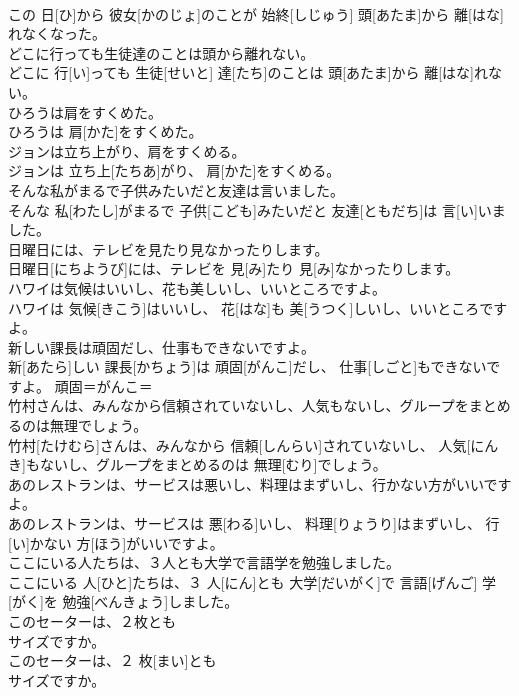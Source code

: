 \documentclass[8pt]{extreport}
\begin{document}
\begin{CJK}{UTF8}{min}
\\	この 日[ひ]から 彼女[かのじょ]のことが 始終[しじゅう] 頭[あたま]から 離[はな]れなくなった。	
\\	どこに行っても生徒達のことは頭から離れない。	
\\	どこに 行[い]っても 生徒[せいと] 達[たち]のことは 頭[あたま]から 離[はな]れない。	
\\	ひろうは肩をすくめた。	
\\	ひろうは 肩[かた]をすくめた。	
\\	ジョンは立ち上がり、肩をすくめる。	
\\	ジョンは 立ち上[たちあ]がり、 肩[かた]をすくめる。	
\\	そんな私がまるで子供みたいだと友達は言いました。	
\\	そんな 私[わたし]がまるで 子供[こども]みたいだと 友達[ともだち]は 言[い]いました。	
\\	日曜日には、テレビを見たり見なかったりします。	
\\	日曜日[にちようび]には、テレビを 見[み]たり 見[み]なかったりします。	
\\	ハワイは気候はいいし、花も美しいし、いいところですよ。	
\\	ハワイは 気候[きこう]はいいし、 花[はな]も 美[うつく]しいし、いいところですよ。	
\\	新しい課長は頑固だし、仕事もできないですよ。	
\\	新[あたら]しい 課長[かちょう]は 頑固[がんこ]だし、 仕事[しごと]もできないですよ。	頑固＝がんこ＝ 
\\	竹村さんは、みんなから信頼されていないし、人気もないし、グループをまとめるのは無理でしょう。	
\\	竹村[たけむら]さんは、みんなから 信頼[しんらい]されていないし、 人気[にんき]もないし、グループをまとめるのは 無理[むり]でしょう。	
\\	あのレストランは、サービスは悪いし、料理はまずいし、行かない方がいいですよ。	
\\	あのレストランは、サービスは 悪[わる]いし、 料理[りょうり]はまずいし、 行[い]かない 方[ほう]がいいですよ。	
\\	ここにいる人たちは、３人とも大学で言語学を勉強しました。	
\\	ここにいる 人[ひと]たちは、３ 人[にん]とも 大学[だいがく]で 言語[げんご] 学[がく]を 勉強[べんきょう]しました。	
\\	このセーターは、２枚とも
\\	サイズですか。	
\\	このセーターは、２ 枚[まい]とも 
\\	サイズですか。	

\end{CJK}
\end{document}
